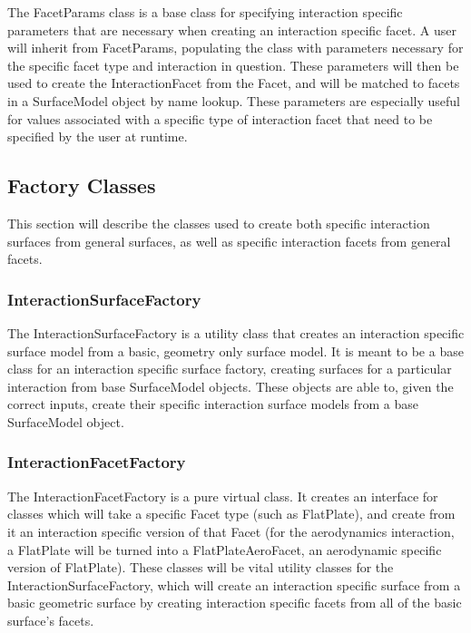 The FacetParams class is a base class for specifying interaction
specific parameters that are necessary when creating an interaction specific
facet. A user will inherit from FacetParams, populating the
class with parameters necessary for the specific facet type and interaction
in question. These parameters will then be used to create the
InteractionFacet from the Facet, and will be matched to facets in
a SurfaceModel object by name lookup. These parameters are especially
useful for values associated with a specific type of interaction facet
that need to be specified by the user at runtime.

\subsection{Factory Classes}

This section will describe the classes used to create
both specific interaction surfaces from general surfaces, as well as
specific interaction facets from general facets.

\subsubsection{InteractionSurfaceFactory}

The InteractionSurfaceFactory is a utility class that creates
an interaction specific surface model from a basic, geometry only
surface model. It is meant to be a base class for an interaction specific
surface factory, creating surfaces for a particular interaction from
base SurfaceModel objects. These objects are able to, given the correct
inputs, create their specific interaction surface models from a base
SurfaceModel object.

\subsubsection{InteractionFacetFactory}

The InteractionFacetFactory is a pure virtual class. It creates an interface
for classes which will take a specific Facet type (such as FlatPlate), and
create from it an interaction specific version of that Facet (for
the aerodynamics interaction, a FlatPlate will be turned into a
FlatPlateAeroFacet, an aerodynamic specific version of FlatPlate).
These classes will be vital utility classes for the InteractionSurfaceFactory, which will create an interaction specific surface from a basic
geometric surface by creating interaction specific facets from
all of the basic surface's facets.

